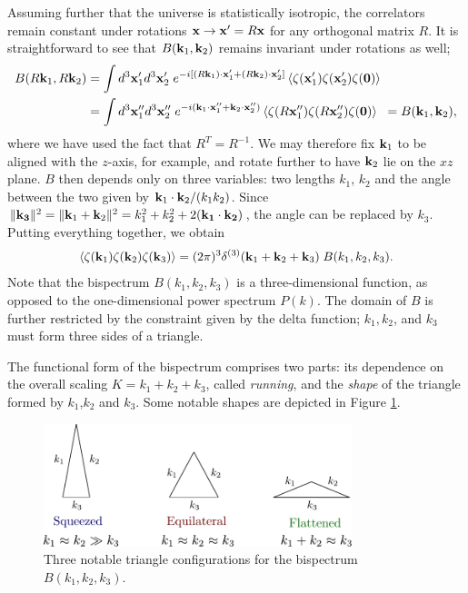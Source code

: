 Assuming further that the universe is statistically isotropic, the correlators remain constant under rotations $\mathbf{x} \rightarrow \mathbf{x}' = R \mathbf{x}$ for any orthogonal matrix $R$. It is straightforward to see that $B(\mathbf{k}_1,\mathbf{k}_2)$ remains invariant under rotations as well;
\begin{align}
	B(R\mathbf{k}_1, R\mathbf{k}_2) &= \int d^3\mathbf{x}'_1 d^3\mathbf{x}'_2 \; e^{-i[ (R\mathbf{k}_1) \cdot \mathbf{x}'_1 + (R\mathbf{k}_2) \cdot \mathbf{x}'_2]} \left< \zeta(\mathbf{x}'_1) \zeta(\mathbf{x}'_2) \zeta(\mathbf{0}) \right> \\
	&= \int d^3\mathbf{x}''_1 d^3\mathbf{x}''_2 \; e^{-i( \mathbf{k}_1 \cdot \mathbf{x}''_1 + \mathbf{k}_2 \cdot \mathbf{x}''_2)} \left< \zeta(R \mathbf{x}''_1) \zeta(R \mathbf{x}''_2) \zeta(\mathbf{0}) \right> \;\;= B(\mathbf{k}_1, \mathbf{k}_2),
\end{align}
where we have used the fact that $R^T=R^{-1}$. We may therefore fix $\mathbf{k}_1$ to be aligned with the $z$-axis, for example, and rotate further to have $\mathbf{k}_2$ lie on the $xz$ plane. $B$ then depends only on three variables: two lengths $k_1$, $k_2$ and the angle between the two given by $\mathbf{k}_1 \cdot \mathbf{k}_2 / (k_1 k_2)$. Since $\| \mathbf{k_3} \|^2 = \| \mathbf{k}_1+\mathbf{k}_2 \|^2 = k_1^2 + k_2^2 + 2(\mathbf{k_1}\cdot\mathbf{k_2})$, the angle can be replaced by $k_3$. Putting everything together, we obtain
\begin{align}
	\left< \zeta(\mathbf{k}_1) \zeta(\mathbf{k}_2) \zeta(\mathbf{k}_3) \right> =  (2\pi)^3 \delta^{(3)}(\mathbf{k}_1 + \mathbf{k}_2 + \mathbf{k}_3) \; B(k_1, k_2, k_3).
\end{align}
Note that the bispectrum $B(k_1,k_2,k_3)$ is a three-dimensional function, as opposed to the one-dimensional power spectrum $P(k)$. The domain of $B$ is further restricted by the constraint given by the delta function; $k_1,k_2$, and $k_3$ must form three sides of a triangle.

The functional form of the bispectrum comprises two parts: its dependence on the overall scaling $K=k_1+k_2+k_3$, called \textit{running}, and the \textit{shape} of the triangle formed by $k_1$,$k_2$ and $k_3$. Some notable shapes are depicted in Figure \ref{fig:triangle_configurations}.

\begin{figure}
	\centering
	\includegraphics[width=0.8\textwidth]{triangle_configurations.pdf}
	\hspace{10pt}
	\caption{Three notable triangle configurations for the bispectrum $B(k_1,k_2,k_3)$.}
	\label{fig:triangle_configurations}
\end{figure}

